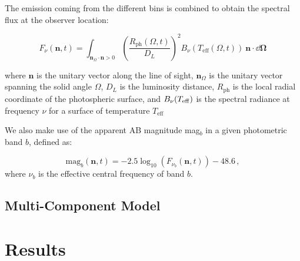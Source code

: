 The emission coming from the different bins is combined to obtain the spectral flux at the observer location:

\begin{equation}
\label{eq:spectral_flux}
F_{\nu}(\mathbf{n},t) = \int_{\mathbf{n}_{\Omega} \cdot \mathbf{n}> 0} \left( \frac{R_{\text{ph}}(\Omega,t)}{D_L} \right)^2  B_{\nu}(T_{\text{eff}}(\Omega,t))~\mathbf{n} \cdot  \dd\boldsymbol{\Omega} 
\end{equation}

where $\mathbf{n}$ is the unitary vector along the line of sight, $\mathbf{n}_{\Omega}$ is the unitary vector spanning the solid angle $\Omega$, $D_L$ is the luminosity distance, $R_{\text{ph}}$ is the local radial coordinate of the photospheric surface, and $B_{\nu}(T_{\rm eff})$ is the spectral radiance at frequency $\nu$ for a surface of temperature $T_{\text{eff}}$

We also make use of the apparent AB magnitude mag$_b$ in a given photometric band $b$, defined as:

\begin{equation}
\label{eq:mag}
\text{mag}_b(\mathbf{n},t) = -2.5 \log_{10}\left( F_{\nu_b}(\mathbf{n},t) \right)-48.6\,,
\end{equation}
where $\nu_b$ is the effective central frequency of band $b$.


\subsection{Multi-Component Model}

\section{Results}